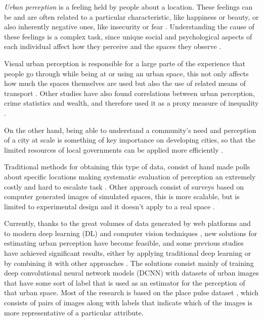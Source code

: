 \textit{Urban perception} is a feeling held by people about a location. These feelings can be and
are often related to a particular characteristic, like happiness or beauty, or also
inherently negative ones, like insecurity or fear \cite{tamara_judgments}. Understanding the
cause of these feelings is a complex task, since unique social and psychological aspects
of each individual affect how they perceive and the spaces they observe \cite{nasar_perception}.

Visual urban perception is  responsible for a large parte of the experience that people
go through while  being at or using an urban space, this not only affects how much the spaces
themselves are used \cite{khisty} but also the use of related means of transport \cite{antonakos}.
Other studies have also found correlations between urban perception, crime statistics \cite{tamara_judgments}
and wealth, and therefore used it as a proxy measure of inequality \cite{tamara_judgments,hidalgo_inequality, rossetti}.

On the other hand, being able to understand a community's need and perception of a city at scale is something
of key importance on developing cities, so that the limited  resources of local governments can be applied
more efficiently \cite{santani}.

Traditional methods for obtaining this type of data, consist of hand made polls
about specific locations making systematic evaluation of perception  an extremely costly and hard
to escalate task \cite{nasar_perception,clifton}. Other approach consist of surveys based on
computer generated images of simulated spaces, this is more scalable, but is limited to experimental
design and it doesn't apply to a real space \cite{lain_grenspace,iglesias_perception}.

Currently, thanks to the great volumes of data generated by web platforms \cite{hidalgo_inequality}
and to modern deep learning (DL) and computer vision techniques \cite{lecun_dl}, new solutions for
estimating urban perception have become feasible, and some previous studies have achieved
significant results, either by applying traditional deep learning \cite{hidalgo_placepulse}
or by combining it with other approaches \cite{rossetti, zhang_measuring}. The solutions consist
mainly of training deep convolutional neural network models (DCNN) \cite{lecun_mnist} with datasets
of urban images that have some sort of label that is used as an estimator for the perception
of that urban space. Most of the research is based on the place pulse dataset \cite{hidalgo_placepulse}, which
consists of pairs of images along with labels that indicate which of the images is more representative of a
particular attribute.

